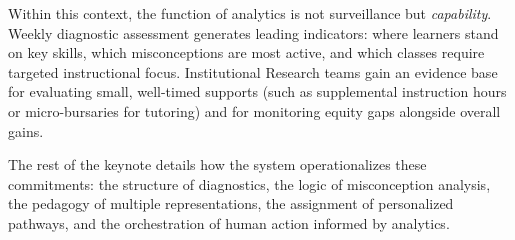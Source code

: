 Within this context, the function of analytics is not surveillance but \emph{capability}. Weekly diagnostic assessment generates leading indicators: where learners stand on key skills, which misconceptions are most active, and which classes require targeted instructional focus. Institutional Research teams gain an evidence base for evaluating small, well-timed supports (such as supplemental instruction hours or micro-bursaries for tutoring) and for monitoring equity gaps alongside overall gains.

The rest of the keynote details how the system operationalizes these commitments: the structure of diagnostics, the logic of misconception analysis, the pedagogy of multiple representations, the assignment of personalized pathways, and the orchestration of human action informed by analytics.

